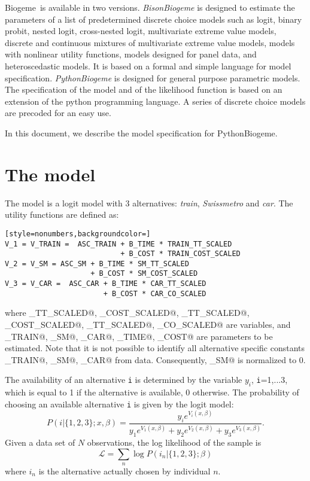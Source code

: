 \documentclass[12pt,a4paper]{article}
\renewcommand{\L}{\mathcal{L}}
\newcommand{\PBIOGEME}{PythonBiogeme}
\newcommand{\BIOGEME}{Biogeme}
\begin{document}
\BIOGEME\ is available in two versions. \emph{BisonBiogeme} is designed to
estimate the parameters of a list of predetermined discrete choice
models such as logit, binary probit, nested logit, cross-nested logit,
multivariate extreme value models, discrete and continuous mixtures of
multivariate extreme value models, models with nonlinear utility
functions, models designed for panel data, and heteroscedastic
models. It is based on a formal and simple language for model
specification.
\emph{PythonBiogeme} is designed for general purpose parametric models. The
specification of the model and of the likelihood function is based on
an extension of the python programming language. A series of discrete
choice models are precoded for an easy use. 

In this document, we describe the model
specification for \PBIOGEME.

\section{The model}
The model is a logit model with 3 alternatives: \emph{train}, \emph{Swissmetro} and \emph{car}. The utility functions are defined as:
\begin{lstlisting}[style=nonumbers,backgroundcolor=]
V_1 = V_TRAIN =  ASC_TRAIN + B_TIME * TRAIN_TT_SCALED 
                           + B_COST * TRAIN_COST_SCALED
V_2 = V_SM = ASC_SM + B_TIME * SM_TT_SCALED 
                    + B_COST * SM_COST_SCALED
V_3 = V_CAR =  ASC_CAR + B_TIME * CAR_TT_SCALED 
                       + B_COST * CAR_CO_SCALED
\end{lstlisting}
where 
\lstinline@TRAIN_TT_SCALED@,
\lstinline@TRAIN_COST_SCALED@,
\lstinline@SM_TT_SCALED@,
\lstinline@SM_COST_SCALED@,
\lstinline@CAR_TT_SCALED@,
\lstinline@CAR_CO_SCALED@
are variables, and 
  \lstinline@ASC_TRAIN@,
  \lstinline@ASC_SM@,
  \lstinline@ASC_CAR@,
  \lstinline@B_TIME@,
  \lstinline@B_COST@ are parameters to be estimated. Note that it is not possible to identify all alternative specific constants  
  \lstinline@ASC_TRAIN@,
  \lstinline@ASC_SM@,
  \lstinline@ASC_CAR@ from data. Consequently,  \lstinline@ASC_SM@ is normalized to 0. 

The availability of an alternative \texttt{i} is determined by the
variable $y_i$, \texttt{i}=1,...3, which is equal to 1 if the
alternative is available, 0 otherwise. The probability of choosing an
available alternative \texttt{i} is given by the logit model: 
\begin{equation}
P(i|\{1,2,3\};x,\beta) = \frac{y_i e^{V_i(x,\beta)}}{y_1 e^{V_1(x,\beta)} + y_2 e^{V_2(x,\beta)}+ y_3 e^{V_3(x,\beta)}}.
\end{equation}
Given a data set of $N$ observations, the log likelihood of the
sample is 
\begin{equation}
\L = \sum_n \log P(i_n|\{1,2,3\};\beta)
\end{equation}
where $i_n$ is the alternative actually chosen
by individual $n$.  
\end{document}
